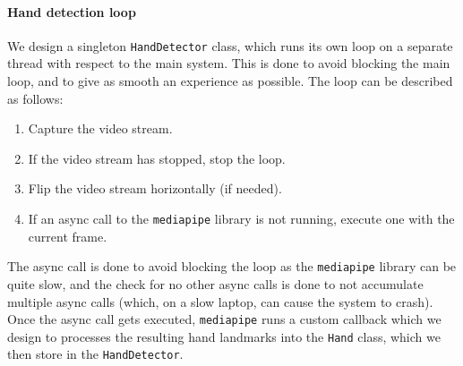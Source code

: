 \documentclass[a4paper, 11pt, twocolumn]{IEEEtran}
\begin{document}
    \paragraph*{Hand detection loop} We design a singleton \texttt{HandDetector} class, which runs its own loop on a separate thread with respect to the main system. This is done to avoid blocking the main loop, and to give as smooth an experience as possible. The loop can be described as follows:
    \begin{enumerate}
        \item Capture the video stream.
        \item If the video stream has stopped, stop the loop.
        \item Flip the video stream horizontally (if needed).
        \item If an async call to the \texttt{mediapipe} library is not running, execute one with the current frame.
    \end{enumerate}
    The async call is done to avoid blocking the loop as the \texttt{mediapipe} library can be quite slow, and the check for no other async calls is done to not accumulate multiple async calls (which, on a slow laptop, can cause the system to crash). Once the async call gets executed, \texttt{mediapipe} runs a custom callback which we design to processes the resulting hand landmarks into the \texttt{Hand} class, which we then store in the \texttt{HandDetector}.
\end{document}
